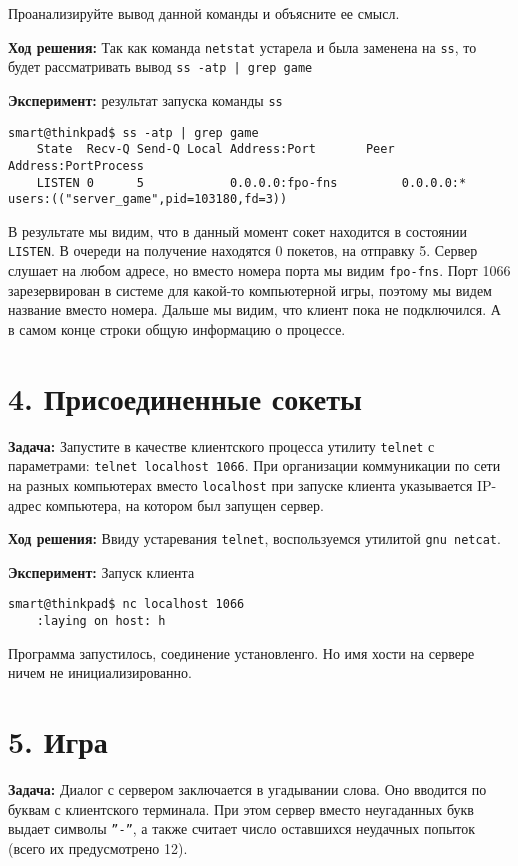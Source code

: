 Проанализируйте вывод данной команды и объясните ее смысл.

\textbf{Ход решения:} Так как команда \texttt{netstat} устарела и была заменена на \texttt{ss}, то будет рассматривать вывод \texttt{ss -atp | grep game}

\textbf{Эксперимент:} результат запуска команды \texttt{ss}
\begin{Verbatim}[frame=single,breaklines=true,breakanywhere=true]
    smart@thinkpad$ ss -atp | grep game
    State  Recv-Q Send-Q Local Address:Port       Peer Address:PortProcess
    LISTEN 0      5            0.0.0.0:fpo-fns         0.0.0.0:*    users:(("server_game",pid=103180,fd=3))
\end{Verbatim}

В результате мы видим, что в данный момент сокет находится в состоянии \texttt{LISTEN}. В очереди на получение находятся 0 покетов, на отправку 5. Сервер слушает на любом адресе, но вместо номера порта мы видим \texttt{fpo-fns}. Порт 1066 зарезервирован в системе для какой-то компьютерной игры, поэтому мы видем название вместо номера. Дальше мы видим, что клиент пока не подключился. А в самом конце строки общую информацию о процессе.

\section*{4. Присоединенные сокеты}
\textbf{Задача:} Запустите в качестве клиентского процесса утилиту \texttt{telnet} с параметрами: \texttt{telnet localhost 1066}. При организации коммуникации по сети на разных компьютерах вместо \texttt{localhost} при запуске клиента указывается IP-адрес компьютера, на котором был запущен сервер.

\textbf{Ход решения:} Ввиду устаревания \texttt{telnet}, воспользуемся утилитой \texttt{gnu netcat}.

\textbf{Эксперимент:} Запуск клиента
\begin{Verbatim}[frame=single,breaklines=true,breakanywhere=true]
    smart@thinkpad$ nc localhost 1066
    :laying on host: h
\end{Verbatim}
Программа запустилось, соединение установленго. Но имя хости на сервере ничем не инициализированно.

\section*{5. Игра}
\textbf{Задача:} Диалог с сервером заключается в угадывании слова. Оно вводится по буквам с клиентского терминала. При этом сервер вместо неугаданных букв выдает символы \texttt{”-”}, а также считает число оставшихся неудачных попыток (всего их предусмотрено 12).

